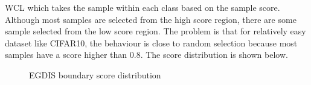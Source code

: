 WCL which takes the sample within each class based on the sample score. Although most samples are selected from the high score region, there are some sample selected from the low score region. The problem is that for relatively easy dataset like CIFAR10, the behaviour is close to random selection because most samples have a score higher than 0.8. The score distribution is shown below.

\begin{figure}[H]
\centering  
{}
\caption{EGDIS boundary score distribution}
\label{Fig.egdisboscores}
\end{figure}

